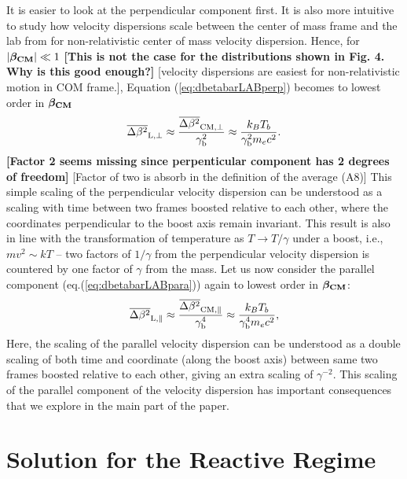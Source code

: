 \documentclass[usenatbib,iop,apj,numberedappendix]{aeb_emulateapj_2015}
\newcommand\ep[1]{{\color{magenta} \bf #1}} %
\newcommand\phil[1]{{\color{cyan} #1}}
\newcommand\bmath[1] {\mbox{\boldmath$\rm #1$}}
\newcommand{\betaCM}{\ensuremath{\bmath{\beta_{\rm CM}}}}
\newcommand{\dbetabarLABpara}{\ensuremath{\overline{\Delta\beta^2}_{\rm L, \parallel}}}
\newcommand{\dbetabarLABperp}{\ensuremath{\overline{\Delta\beta^2}_{\rm L, \perp}}}
\newcommand{\dbetabarCMpara}{\ensuremath{\overline{\Delta\beta^2}_{\rm CM, \parallel}}}
\newcommand{\dbetabarCMperp}{\ensuremath{\overline{\Delta\beta^2}_{\rm CM, \perp}}}
\newcommand{\gammabeam}{\ensuremath{\gamma_{\rm b}}}
\begin{document}
\begin{appendix}
It is easier to look at the perpendicular component first.  It is also more intuitive to study how velocity dispersions scale between the center of mass frame and the lab from for non-relativistic center of mass velocity dispersion.  Hence, for $\left|\betaCM\right| \ll 1$ \ep{[This is not the case for the distributions shown in Fig. 4. Why is this good enough?]}\phil{[velocity dispersions are easiest for non-relativistic motion in COM frame.]}, Equation (\ref{eq:dbetabarLABperp}) becomes to lowest order in $\betaCM$ 
\begin{equation}
 \dbetabarLABperp \approx \frac{\dbetabarCMperp}{\gammabeam^2} \approx \frac {k_B T_b}{\gammabeam^2 m_e c^2 }.
\end{equation}
\ep{[Factor 2 seems missing since perpenticular component has 2 degrees of freedom]}\phil{[Factor of two is absorb in the definition of the average (A8)]} This simple scaling of the perpendicular velocity dispersion can be understood as a scaling with time between two frames boosted relative to each other, where the coordinates perpendicular to the boost axis remain invariant.  This result is also in line with the transformation of temperature as $T\rightarrow T/\gamma$ under a boost, i.e., $mv^2 \sim kT$ -- two factors of $1/\gamma$ from the perpendicular velocity dispersion is countered by one factor of $\gamma$ from the mass.  Let us now consider the parallel component (eq.(\ref{eq:dbetabarLABpara})) again to lowest order in $\betaCM$: 
\begin{equation}
 \dbetabarLABpara \approx \frac{\dbetabarCMpara}{\gammabeam^{4}}  \approx \frac {k_B T_b}{\gammabeam^4 m_e c^2 },
\end{equation}
Here, the scaling of the parallel velocity dispersion can be understood as a double scaling of both time and coordinate (along the boost axis) between same two frames boosted relative to each other, giving an extra scaling of $\gamma^{-2}$.
This scaling of the parallel component of the velocity dispersion has important consequences that we explore in the main part of the paper.  



\section{Solution for the Reactive Regime}\label{sec:solution reactive}


\end{appendix}
\end{document}
